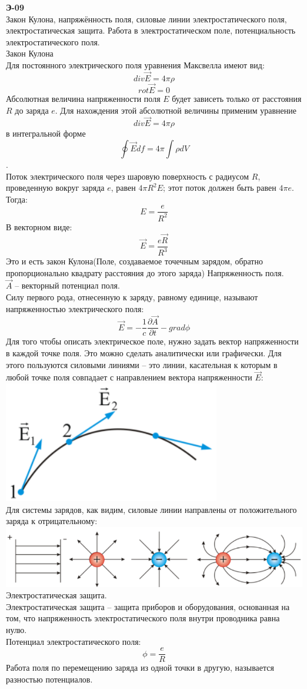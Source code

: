 \documentclass[__main__.tex]{subfiles}
\begin{document}
\textbf{Э-09}\\

Закон Кулона, напряжённость поля, силовые линии электростатического поля, электростатическая защита. Работа в электростатическом поле, потенциальность электростатического поля.\\

Закон Кулона\\
Для постоянного электрического поля уравнения Максвелла имеют вид:
$$ div \vec{E} = 4 \pi \rho$$
$$ rot \vec{E} = 0$$
Абсолютная величина напряженности поля $E$ будет зависеть только от расстояния $R$ до заряда $e$. Для нахождения этой абсолютной величины применим уравнение $$ div \vec{E} = 4 \pi \rho$$ в интегральной форме $$\oint \vec{E} df = 4 \pi \int \rho dV$$.\\
Поток электрического поля через шаровую поверхность с радиусом $R$, проведенную вокруг заряда $e$, равен $4\pi R^2 E$; этот поток должен быть равен $4\pi e$. Тогда:\\
$$E = \frac{e}{R^2}$$
В векторном виде:
$$\vec{E} = \frac{e \vec{R}}{R^3}$$
Это и есть закон Кулона(Поле, создаваемое точечным зарядом, обратно пропорционально квадрату расстояния до этого заряда)
Напряженность поля.\\
$\vec{A}$ -- векторный потенциал поля.\\
Силу первого рода, отнесенную к заряду, равному единице, называют напряженностью электрического поля:\\
$$\vec{E} = -\frac{1}{c}\frac{\partial \vec{A}}{\partial t}-grad \phi$$
Для того чтобы описать электрическое поле, нужно задать вектор напряженности в каждой точке поля. Это можно сделать аналитически или графически. Для этого пользуются силовыми линиями – это линии, касательная к которым в любой точке поля совпадает с направлением вектора напряженности $\vec{E}$:\\
\includegraphics[width=.5\linewidth]{img/e-09-1}\\
Для системы зарядов, как видим, силовые линии направлены от положительного заряда к отрицательному:\\
\includegraphics[width=.9\linewidth]{img/e-09-2}\\
Электростатическая защита.\\
Электростатическая защита – защита приборов и оборудования, основанная на том, что напряженность электростатического поля внутри проводника равна нулю.\\
Потенциал электростатического поля:
$$\phi = \frac{e}{R}$$
Работа поля по перемещению заряда из одной точки в другую, называется разностью потенциалов.\\
\end{document}

